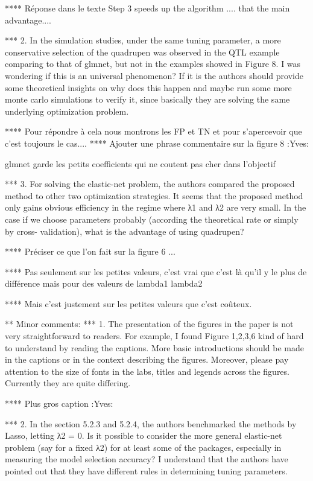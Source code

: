 \documentclass[a4paper,11pt]{texMemo}
\begin{document}
**** Réponse dans le texte 
Step 3 speeds up the algorithm .... that the main advantage....

*** 2. In the simulation studies, under the same tuning parameter, a more conservative
selection of the quadrupen was observed in the QTL example comparing to that of
glmnet, but not in the examples showed in Figure 8. I was wondering if this is an
universal phenomenon? If it is the authors should provide some theoretical insights
on why does this happen and maybe run some more monte carlo simulations to verify
it, since basically they are solving the same underlying optimization problem.

**** Pour répondre à cela nous montrons les FP et TN et pour s'apercevoir que c'est toujours le cas....
**** Ajouter une phrase commentaire sur la figure 8   :Yves:

glmnet garde les petits coefficients qui ne coutent pas cher dans l'objectif

*** 3. For solving the elastic-net problem, the authors compared the proposed method to
other two optimization strategies. It seems that the proposed method only gains
obvious efficiency in the regime where λ1 and λ2 are very small. In the case if
we choose parameters probably (according the theoretical rate or simply by cross-
validation), what is the advantage of using quadrupen?

**** Préciser ce que l'on fait sur la figure 6 ... 

**** Pas seulement sur les petites valeurs,
c'est vrai que c'est là qu'il y
le plus de différence mais pour
des valeurs de lambda1 lambda2


**** Mais c'est justement 
sur les petites valeurs que c'est coûteux.



** Minor comments:
*** 1. The presentation of the figures in the paper is not very straightforward to readers. For
example, I found Figure 1,2,3,6 kind of hard to understand by reading the captions.
More basic introductions should be made in the captions or in the context describing
the figures. Moreover, please pay attention to the size of fonts in the labs, titles and
legends across the figures. Currently they are quite differing.


**** Plus gros caption :Yves:


*** 2. In the section 5.2.3 and 5.2.4, the authors benchmarked the methods by Lasso, letting
λ2 = 0. Is it possible to consider the more general elastic-net problem (say for a fixed
λ2) for at least some of the packages, especially in measuring the model selection
accuracy? I understand that the authors have pointed out that they have different
rules in determining tuning parameters.
\end{document}
